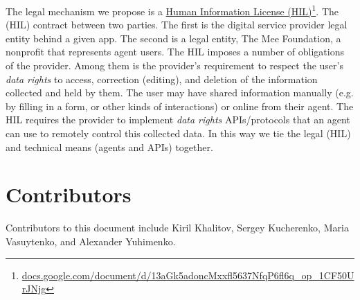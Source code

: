 \documentclass[11pt, oneside]{article}   	%
\newcommand{\hyperfootnote}[1][]{\def\ArgI{{#1}}\hyperfootnoteRelay}
\newcommand\hyperfootnoteRelay[2][]{\href{#1#2}{\ArgI}\footnote{\href{#1#2}{#2}}}
\begin{document}
The legal mechanism we propose is a \hyperfootnote[Human Information License (HIL)][https://]{docs.google.com/document/d/13aGk5adoncMxxfl5637NfqP6fl6q\_op\_1CF50UrJNjg}. The (HIL) contract between two parties. The first is the digital service provider legal entity behind a given app. The second is a legal entity, The Mee Foundation, a nonprofit that represents agent users. The HIL imposes a number of obligations of the provider. Among them is the provider's requirement to respect the user's \emph{data rights} to access, correction (editing), and deletion of the information collected and held by them. The user may have shared information manually (e.g. by filling in a form, or other kinds of interactions) or online from their agent. The HIL requires the provider to implement \emph{data rights} APIs/protocols that an agent can use to remotely control this collected data. In this way we tie the legal (HIL) and technical means (agents and APIs) together.


\section{Contributors}
Contributors to this document include Kiril Khalitov, Sergey Kucherenko, Maria Vasuytenko, and Alexander Yuhimenko.



\end{document}
